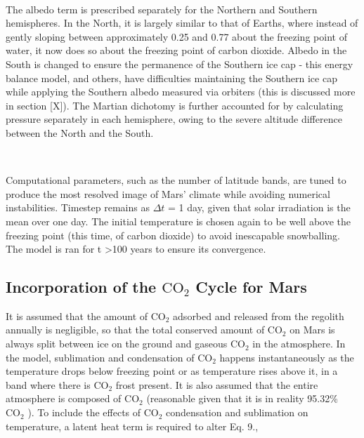 \documentclass[12pt,onecolumn]{revtex4-2}    %
\begin{document}
\

The albedo term is prescribed separately for the Northern and Southern hemispheres. In the North, it is largely similar to that of Earths, where instead of gently sloping between approximately 0.25 and 0.77 about the freezing point of water, it now does so about the freezing point of carbon dioxide. Albedo in the South is changed to ensure the permanence of the Southern ice cap - this energy balance model, and others, have difficulties maintaining the Southern ice cap while applying the Southern albedo measured via orbiters (this is discussed more in section [X]). The Martian dichotomy is further accounted for by calculating pressure separately in each hemisphere, owing to the severe altitude difference between the North and the South.

\

Computational parameters, such as the number of latitude bands, are tuned to produce the most resolved image of Mars' climate while avoiding numerical instabilities. Timestep remains as $\Delta t$ = 1 day, given that solar irradiation is the mean over one day. The initial temperature is chosen again to be well above the freezing point (this time, of carbon dioxide) to avoid inescapable snowballing. The model is ran for t \textgreater 100 years to ensure its convergence.

\subsection{Incorporation of the $\mathrm{CO_2}$ Cycle for Mars}

It is assumed that the amount of $\mathrm{CO_2}$ adsorbed and released from the regolith annually is negligible, so that the total conserved amount of $\mathrm{CO_2}$ on Mars is always split between ice on the ground and gaseous $\mathrm{CO_2}$ in the atmosphere. In the model, sublimation and condensation of $\mathrm{CO_2}$ happens instantaneously as the temperature drops below freezing point or as temperature rises above it, in a band where there is $\mathrm{CO_2}$ frost present. It is  also assumed that the entire atmosphere is composed of $\mathrm{CO_2}$ (reasonable given that it is in reality 95.32\% $\mathrm{CO_2}$ \cite{JN82}). To include the effects of $\mathrm{CO_2}$ condensation and sublimation on temperature, a latent heat term is required to alter Eq. 9.,  %
\end{document}
